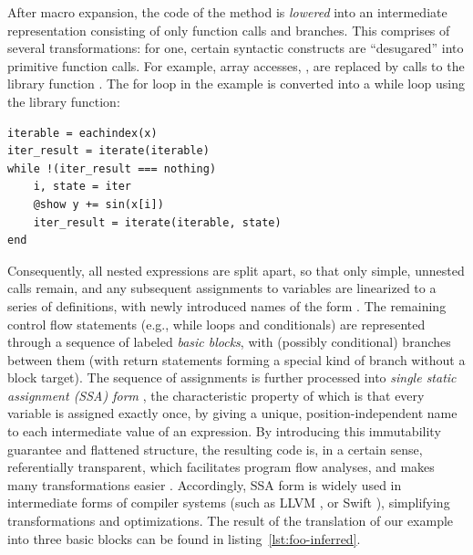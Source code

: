 After macro expansion, the code of the method is \emph{lowered} into an intermediate
representation consisting of only function calls and branches.  This comprises of several
transformations: for one, certain syntactic constructs are \enquote{desugared} into primitive
function calls.  For example, array accesses, , are replaced by calls to the library
function .  The for loop in the example is converted into a while loop using
the  library function:
\begin{lstlisting}
iterable = eachindex(x)
iter_result = iterate(iterable)
while !(iter_result === nothing)
    i, state = iter
    @show y += sin(x[i])
    iter_result = iterate(iterable, state)
end
\end{lstlisting}
Consequently, all nested expressions are split apart, so that only simple, unnested calls remain,
and any subsequent assignments to variables are linearized to a series of definitions, with newly
introduced names of the form .  The remaining control flow statements (e.g., while loops
and conditionals) are represented through a sequence of labeled \emph{basic blocks}, with (possibly
conditional) branches between them (with return statements forming a special kind of branch without
a block target).  The sequence of assignments is further processed into \emph{single static
  assignment (SSA) form} \parencite{rosen1988global,singer2018static}, the characteristic property
of which is that every variable is assigned exactly once, by giving a unique, position-independent
name to each intermediate value of an expression.  By introducing this immutability guarantee and
flattened structure, the resulting code is, in a certain sense, referentially transparent, which
facilitates program flow analyses, and makes many transformations easier
\parencite{muchnick1997advanced}.  Accordingly, SSA form is widely used in intermediate forms of
compiler systems (such as LLVM \parencite{llvmproject2019llvm}, or Swift
\parencite{apple2020swifta}), simplifying transformations and optimizations.  The result of the
translation of our example into three basic blocks can be found in
listing~\ref{lst:foo-inferred}.

